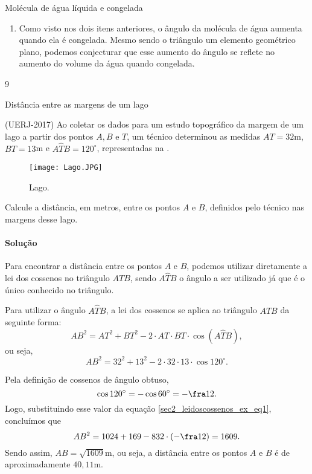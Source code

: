 \begin{answer}{Molécula de água líquida e congelada}
{\begin{enumerate}
    \item{}
    Como visto nos dois itens anteriores, o ângulo da molécula de água aumenta quando ela é congelada. Mesmo sendo o triângulo um elemento geométrico plano, podemos conjecturar que esse aumento do ângulo se reflete no aumento do volume da água quando congelada. 
\end{enumerate}
}{9}
\end{answer}
\def\currentcolor{session4}

\begin{example}{Distância entre as margens de um lago} \label{sec2_leidoscossenos_ex}

(UERJ-2017) Ao coletar os dados para um estudo topográfico da margem de um lago a partir dos pontos $A, B$ e $T$, um técnico determinou as medidas $AT = 32$m, $BT = 13$m e $A\hat{T}B = 120^\circ$, representadas na .
\begin{figure}[H]
    \centering
    \texttt{[image: Lago.JPG]}
    \caption{Lago.}
    \label{Lago}
\end{figure}
Calcule a distância, em metros, entre os pontos $A$ e $B$, definidos pelo técnico nas margens desse lago.

\paragraph{Solução}
\label{LA_sec2_leidoscossenos_exres}
Para encontrar a distância entre os pontos $A$ e $B$, podemos utilizar diretamente a lei dos cossenos no triângulo $ATB$, sendo $A\hat{T}B$ o ângulo a ser utilizado já que é o único conhecido no triângulo.

Para utilizar o ângulo $A\hat{T}B$, a lei dos cossenos se aplica ao triângulo $ATB$ da seguinte forma:
$$AB^2=AT^2+BT^2-2\cdot AT\cdot BT\cdot\cos(A\hat{T}B),$$ 
ou seja,
\begin{equation}
    AB^2=32^2+13^2-2\cdot32\cdot13\cdot\cos120^\circ. \label{sec2_leidoscossenos_ex_eq1}
\end{equation}

Pela definição de cossenos de ângulo obtuso,
$$\cos120^\circ=-\cos60^\circ=-\fra12.$$
Logo, substituindo esse valor da equação \eqref{sec2_leidoscossenos_ex_eq1}, concluímos que
$$AB^2=1024+169-832\cdot\left(-\fra12\right)=1609.$$
Sendo assim, $AB=\sqrt{1609}$m, ou seja, a distância entre os pontos $A$ e $B$ é de aproximadamente $40,11$m.
\end{example}

\label{prat_leidoscossenos}

